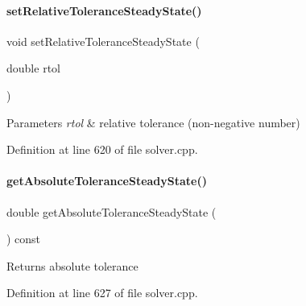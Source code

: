 \paragraph{\texorpdfstring{set\+Relative\+Tolerance\+Steady\+State()}{setRelativeToleranceSteadyState()}}
{\footnotesize\ttfamily void set\+Relative\+Tolerance\+Steady\+State (\begin{DoxyParamCaption}\item[{double}]{rtol }\end{DoxyParamCaption})}


\begin{DoxyParams}{Parameters}
{\em rtol} & relative tolerance (non-\/negative number) \\
\hline
\end{DoxyParams}


Definition at line 620 of file solver.\+cpp.

\mbox{\label{classamici_1_1_solver_adbb1549f9762649455bde39c29d47a03}} 
\paragraph{\texorpdfstring{get\+Absolute\+Tolerance\+Steady\+State()}{getAbsoluteToleranceSteadyState()}}
{\footnotesize\ttfamily double get\+Absolute\+Tolerance\+Steady\+State (\begin{DoxyParamCaption}{ }\end{DoxyParamCaption}) const}

\begin{DoxyReturn}{Returns}
absolute tolerance 
\end{DoxyReturn}


Definition at line 627 of file solver.\+cpp.

